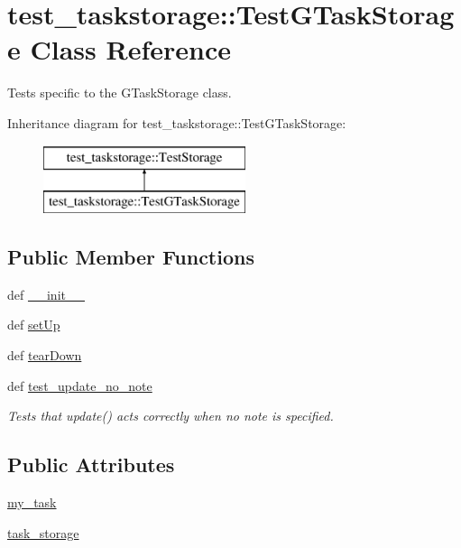 \hypertarget{classtest__taskstorage_1_1TestGTaskStorage}{
\section{test\-\_\-taskstorage\-:\-:\-Test\-G\-Task\-Storage \-Class \-Reference}
\label{classtest__taskstorage_1_1TestGTaskStorage}
}


\-Tests specific to the \-G\-Task\-Storage class.  


\-Inheritance diagram for test\-\_\-taskstorage\-:\-:\-Test\-G\-Task\-Storage\-:\begin{figure}[H]
\begin{center}
\leavevmode
\includegraphics[height=2.000000cm]{classtest__taskstorage_1_1TestGTaskStorage}
\end{center}
\end{figure}
\subsection*{\-Public \-Member \-Functions}
\begin{DoxyCompactItemize}
\item 
def \hyperlink{classtest__taskstorage_1_1TestGTaskStorage_ae5d725daa8804f4bf01b56a5ba28303f}{\-\_\-\-\_\-init\-\_\-\-\_\-}
\item 
def \hyperlink{classtest__taskstorage_1_1TestGTaskStorage_a95893244013933d0bbcc94470b1f560b}{set\-Up}
\item 
def \hyperlink{classtest__taskstorage_1_1TestGTaskStorage_a5611e72f932b66811a0a17939ba65189}{tear\-Down}
\item 
def \hyperlink{classtest__taskstorage_1_1TestGTaskStorage_a8ee10a8d67c0d362ea2665bac82c2646}{test\-\_\-update\-\_\-no\-\_\-note}
\begin{DoxyCompactList}\small\item\em \-Tests that update() acts correctly when no note is specified. \end{DoxyCompactList}\end{DoxyCompactItemize}
\subsection*{\-Public \-Attributes}
\begin{DoxyCompactItemize}
\item 
\hyperlink{classtest__taskstorage_1_1TestGTaskStorage_a64044ab25309aa17502a40daa5983923}{my\-\_\-task}
\item 
\hyperlink{classtest__taskstorage_1_1TestGTaskStorage_abb748de83f5fdbc145f7570464fe13b7}{task\-\_\-storage}
\end{DoxyCompactItemize}


